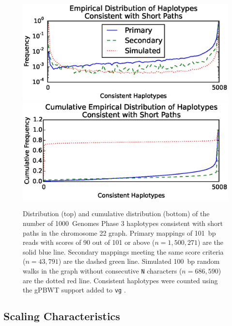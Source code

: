\begin{figure}[h!]
\centering
\includegraphics[width=\linewidth]{figures/03_gpbwt/histogram.eps}
\includegraphics[width=\linewidth]{figures/03_gpbwt/cumulative.eps}
\caption{Distribution (top) and cumulative distribution (bottom) of the number of 1000~Genomes Phase 3 haplotypes consistent with short paths in the chromosome 22 graph. Primary mappings of 101~bp reads with scores of 90 out of 101 or above ($n=1,500,271$) are the solid blue line. Secondary mappings meeting the same score criteria ($n=43,791$) are the dashed green line. Simulated 100~bp random walks in the graph without consecutive \texttt{N} characters ($n=686,590$) are the dotted red line. Consistent haplotypes were counted using the gPBWT support added to \texttt{vg} \cite{garrison2016vg}.}
\label{fig:consistenthaplotypes}
\end{figure}




\subsection{Scaling Characteristics}

